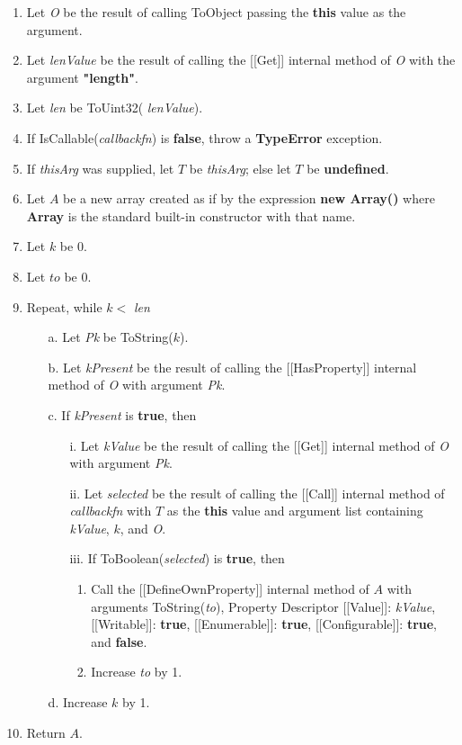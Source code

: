 \documentclass[a4paper,11pt,twoside]{report}
\begin{document}
\begin{enumerate}
\item Let \textit{O} be the result of calling ToObject passing the \textbf{this} value as the argument.
\item Let \textit{lenValue} be the result of calling the [[Get]] internal method of \textit{O} with the argument \textbf{"length"}.
\item Let \textit{len} be ToUint32( \textit{lenValue}).
\item If IsCallable(\textit{callbackfn}) is \textbf{false}, throw a \textbf{TypeError} exception.
\item If \textit{thisArg} was supplied, let $T$ be \textit{thisArg}; else let $T$ be \textbf{undefined}.
\item Let $A$ be a new array created as if by the expression \textbf{new Array()} where \textbf{Array} is the standard built-in constructor with that name.
\item Let $k$ be 0.
\item Let $to$ be 0.
\item Repeat, while $k <$ \textit{len}
\begin{enumerate}
\item[a.] Let \textit{Pk} be ToString($k$).
\item[b.] Let \textit{kPresent} be the result of calling the [[HasProperty]] internal method of \textit{O} with argument \textit{Pk}.
\item[c.] If \textit{kPresent} is \textbf{true}, then
\begin{enumerate}
\item[i.] Let \textit{kValue} be the result of calling the [[Get]] internal method of \textit{O} with argument \textit{Pk}.
\item[ii.] Let \textit{selected} be the result of calling the [[Call]] internal method of \textit{callbackfn} with $T$ as the \textbf{this} value and argument list containing \textit{kValue}, $k$, and \textit{O}.
\item[iii.] If ToBoolean(\textit{selected}) is \textbf{true}, then
\begin{enumerate}
\item Call the [[DefineOwnProperty]] internal method of $A$ with arguments ToString(\textit{to}), Property Descriptor {[[Value]]: \textit{kValue}, [[Writable]]: \textbf{true}, [[Enumerable]]: \textbf{true}, [[Configurable]]: \textbf{true}}, and \textbf{false}.
\item Increase \textit{to} by 1.
\end{enumerate}
\end{enumerate}
\item[d.] Increase $k$ by 1.
\end{enumerate}
\item Return $A$.
\end{enumerate}
\end{document}
